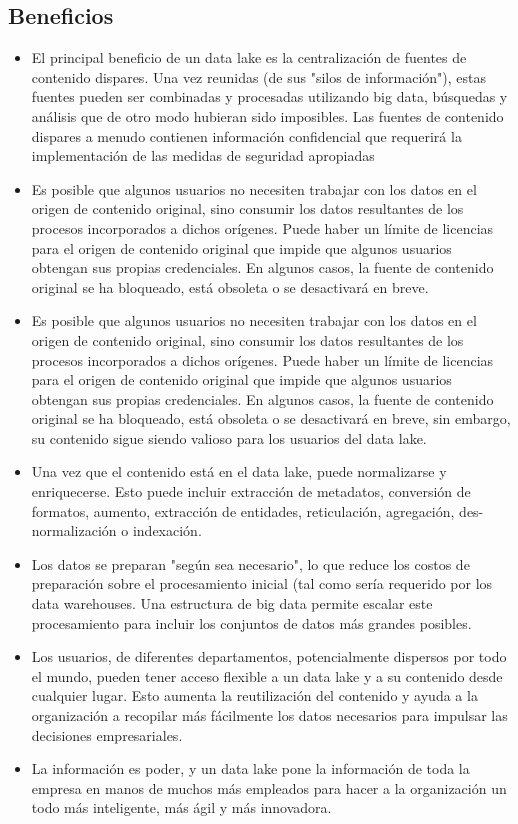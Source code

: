 \documentclass[preprint,12pt]{elsarticle}
\begin{document}
\subsection{Beneficios}
\begin{itemize}
\item El principal beneficio de un data lake es la centralización de fuentes de contenido dispares. Una vez reunidas (de sus "silos de información"), estas fuentes pueden ser combinadas y procesadas utilizando big data, búsquedas y análisis que de otro modo hubieran sido imposibles. Las fuentes de contenido dispares a menudo contienen información confidencial que requerirá la implementación de las medidas de seguridad apropiadas \\
\item Es posible que algunos usuarios no necesiten trabajar con los datos en el origen de contenido original, sino consumir los datos resultantes de los procesos incorporados a dichos orígenes. Puede haber un límite de licencias para el origen de contenido original que impide que algunos usuarios obtengan sus propias credenciales. En algunos casos, la fuente de contenido original se ha bloqueado, está obsoleta o se desactivará en breve.\\
\item Es posible que algunos usuarios no necesiten trabajar con los datos en el origen de contenido original, sino consumir los datos resultantes de los procesos incorporados a dichos orígenes. Puede haber un límite de licencias para el origen de contenido original que impide que algunos usuarios obtengan sus propias credenciales. En algunos casos, la fuente de contenido original se ha bloqueado, está obsoleta o se desactivará en breve, sin embargo, su contenido sigue siendo valioso para los usuarios del data lake.\\
\item Una vez que el contenido está en el data lake, puede normalizarse y enriquecerse. Esto puede incluir extracción de metadatos, conversión de formatos, aumento, extracción de entidades, reticulación, agregación, des-normalización o indexación.\\
\item Los datos se preparan "según sea necesario", lo que reduce los costos de preparación sobre el procesamiento inicial (tal como sería requerido por los data warehouses. Una estructura de big data permite escalar este procesamiento para incluir los conjuntos de datos más grandes posibles.\\
\item Los usuarios, de diferentes departamentos, potencialmente dispersos por todo el mundo, pueden tener acceso flexible a un data lake y a su contenido desde cualquier lugar. Esto aumenta la reutilización del contenido y ayuda a la organización a recopilar más fácilmente los datos necesarios para impulsar las decisiones empresariales.\\
\item La información es poder, y un data lake pone la información de toda la empresa en manos de muchos más empleados para hacer a la organización un todo más inteligente, más ágil y más innovadora.
\end{itemize}
\end{document}
